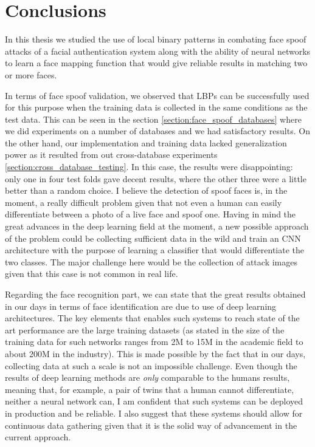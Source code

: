 \chapter{Conclusions}
In this thesis we studied the use of local binary patterns in combating face spoof attacks of a facial authentication system along with the ability of neural networks to learn a face mapping function that would give reliable results in matching two or more faces. 

In terms of face spoof validation, we observed that LBPs can be successfully used for this purpose when the training data is collected in the same conditions as the test data. This can be seen in the section \ref{section:face_spoof_databases} where we did experiments on a number of databases and we had satisfactory results. On the other hand, our implementation and training data lacked generalization power as it resulted from out cross-database experiments \ref{section:cross_database_testing}. In this case, the results were disappointing: only one in four test folds gave decent results, where the other three were a little better than a random choice. I believe the detection of spoof faces is, in the moment, a really difficult problem given that not even a human can easily differentiate between a photo of a live face and spoof one. Having in mind the great advances in the deep learning field at the moment, a new possible approach of the problem could be collecting sufficient data in the wild and train an CNN architecture with the purpose of learning a classifier that would differentiate the two classes. The major challenge here would be the collection of attack images given that this case is not common in real life.

Regarding the face recognition part, we can state that the great results obtained in our days in terms of face identification are due to use of deep learning architectures. The key elements that enables such systems to reach state of the art performance are the large training datasets (as stated in \cite{LiuDBH15} the size of the training data for such networks ranges from 2M to 15M in the academic field to about 200M in the industry). This is made possible by the fact that in our days, collecting data at such a scale is not an impossible challenge. Even though the results of deep learning methods are \textit{only} comparable to the humans results, meaning that, for example, a pair of twins that a human cannot differentiate, neither a neural network can, I am confident that such systems can be deployed in production and be reliable. I also suggest that these systems should allow for continuous data gathering given that it is the solid way of advancement in the current approach.

